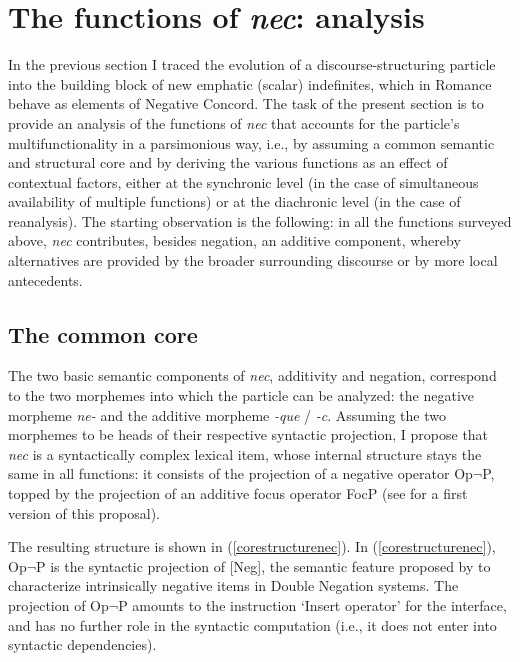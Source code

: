 \documentclass[output=paper,modfonts,nonflat,citecolor=brown,
showindex
]{langsci/langscibook}
\begin{document}
\section{The functions of {\emph{nec}}: analysis} \label{sectionanalysis}

In the previous section I traced the evolution of a discourse-structuring particle into the building block of new emphatic (scalar) indefinites, which in Romance behave as elements of Negative Concord. The task of the present section is to provide an analysis of the functions of {\emph{nec}} that accounts for the particle's multifunctionality in a parsimonious way, i.e., by assuming a common semantic and structural core and by deriving the various functions as an effect of contextual factors, either at the synchronic level (in the case of simultaneous availability of multiple functions) or at the diachronic level (in the case of reanalysis). The starting observation is the following: in all the functions surveyed above, {\emph{nec}} contributes, besides negation, an additive component, whereby alternatives are provided by the broader surrounding discourse or by more local antecedents. 

\subsection{The common core}

The two basic semantic components of {\emph{nec}}, additivity and negation, correspond to the two morphemes into which the particle can be analyzed: the negative morpheme {\emph{ne-}} and the additive morpheme {\emph{-que}} / {\emph{-c}}. Assuming the two morphemes to be heads of their respective syntactic projection, I propose that {\emph{nec}} is a syntactically complex lexical item, whose internal structure stays the same in all functions: it consists of the projection of a negative operator Op$\lnot$P, topped by the projection of an additive focus operator FocP (see \citealt[]{Gianollo17} for a first version of this proposal).

The resulting structure is shown in (\ref{corestructurenec}). In (\ref{corestructurenec}), Op$\lnot$P is the syntactic projection of [Neg], the semantic feature proposed by \citet[]{Zeijlstra04, Zeijlstra14} to characterize intrinsically negative items in Double Negation systems. The projection of Op$\lnot$P amounts to the instruction `Insert operator' for the interface, and has no further role in the syntactic computation (i.e., it does not enter into syntactic dependencies). 
\end{document}
